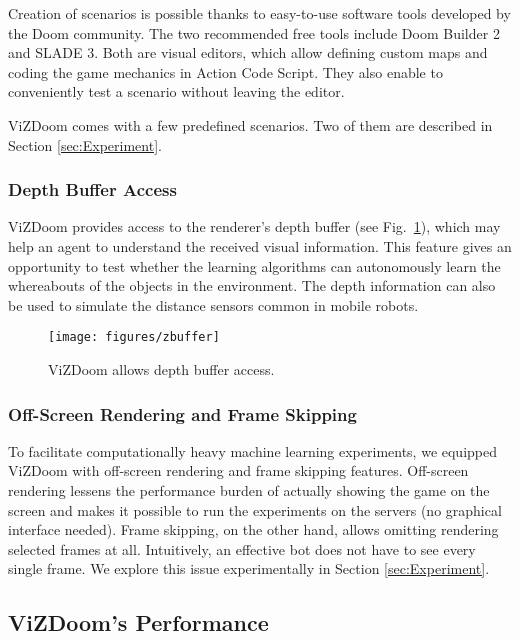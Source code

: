 \documentclass[english,american,conference, balance]{IEEEtran}
\begin{document}
Creation of scenarios is possible thanks to easy-to-use software tools
developed by the Doom community. The two recommended free tools include
Doom Builder 2 and SLADE 3. Both are visual editors, which allow
defining custom maps and coding the game mechanics in Action Code
Script. They also enable to conveniently test a scenario without leaving
the editor.

ViZDoom comes with a few predefined scenarios. Two of them are described
in Section \ref{sec:Experiment}.

\subsubsection{Depth Buffer Access}

ViZDoom provides access to the renderer's depth buffer (see Fig.~\ref{fig:zbuffer}),
which may help an agent to understand the received visual information.
This feature gives an opportunity to test whether the learning algorithms
can autonomously learn the whereabouts of the objects in the environment.
The depth information can also be used to simulate the distance sensors
common in mobile robots.

\begin{figure}
\centering{}\texttt{[image: figures/zbuffer]}
\caption{\label{fig:zbuffer}ViZDoom allows depth buffer access.}
\end{figure}


\subsubsection{Off-Screen Rendering and Frame Skipping\label{subsec:Off-Screen-Skipping}}

To facilitate computationally heavy machine learning experiments,
we equipped ViZDoom with off-screen rendering and frame skipping features.
Off-screen rendering lessens the performance burden of actually showing
the game on the screen and makes it possible to run the experiments
on the servers (no graphical interface needed). Frame skipping, on
the other hand, allows omitting rendering selected frames at all.
Intuitively, an effective bot does not have to see every single frame.
We explore this issue experimentally in Section \ref{sec:Experiment}.

\subsection{ViZDoom's Performance}
\end{document}
